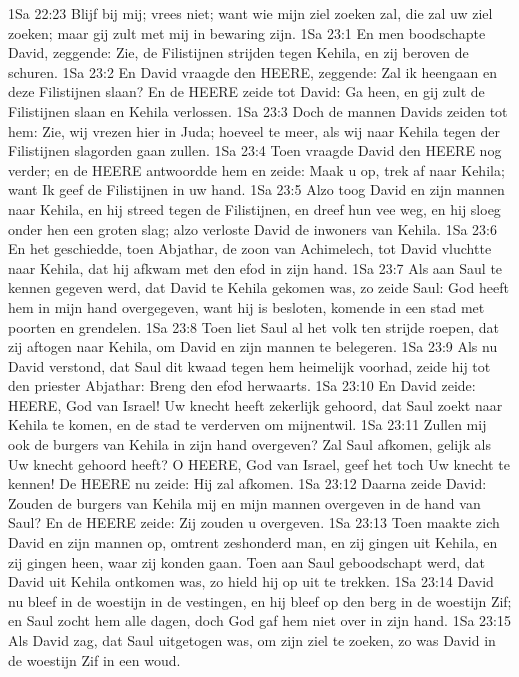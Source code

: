 1Sa 22:23  Blijf bij mij; vrees niet; want wie mijn ziel zoeken zal, die zal uw ziel zoeken; maar gij zult met mij in bewaring zijn.
1Sa 23:1  En men boodschapte David, zeggende: Zie, de Filistijnen strijden tegen Kehila, en zij beroven de schuren.
1Sa 23:2  En David vraagde den HEERE, zeggende: Zal ik heengaan en deze Filistijnen slaan? En de HEERE zeide tot David: Ga heen, en gij zult de Filistijnen slaan en Kehila verlossen.
1Sa 23:3  Doch de mannen Davids zeiden tot hem: Zie, wij vrezen hier in Juda; hoeveel te meer, als wij naar Kehila tegen der Filistijnen slagorden gaan zullen.
1Sa 23:4  Toen vraagde David den HEERE nog verder; en de HEERE antwoordde hem en zeide: Maak u op, trek af naar Kehila; want Ik geef de Filistijnen in uw hand.
1Sa 23:5  Alzo toog David en zijn mannen naar Kehila, en hij streed tegen de Filistijnen, en dreef hun vee weg, en hij sloeg onder hen een groten slag; alzo verloste David de inwoners van Kehila.
1Sa 23:6  En het geschiedde, toen Abjathar, de zoon van Achimelech, tot David vluchtte naar Kehila, dat hij afkwam met den efod in zijn hand.
1Sa 23:7  Als aan Saul te kennen gegeven werd, dat David te Kehila gekomen was, zo zeide Saul: God heeft hem in mijn hand overgegeven, want hij is besloten, komende in een stad met poorten en grendelen.
1Sa 23:8  Toen liet Saul al het volk ten strijde roepen, dat zij aftogen naar Kehila, om David en zijn mannen te belegeren.
1Sa 23:9  Als nu David verstond, dat Saul dit kwaad tegen hem heimelijk voorhad, zeide hij tot den priester Abjathar: Breng den efod herwaarts.
1Sa 23:10  En David zeide: HEERE, God van Israel! Uw knecht heeft zekerlijk gehoord, dat Saul zoekt naar Kehila te komen, en de stad te verderven om mijnentwil.
1Sa 23:11  Zullen mij ook de burgers van Kehila in zijn hand overgeven? Zal Saul afkomen, gelijk als Uw knecht gehoord heeft? O HEERE, God van Israel, geef het toch Uw knecht te kennen! De HEERE nu zeide: Hij zal afkomen.
1Sa 23:12  Daarna zeide David: Zouden de burgers van Kehila mij en mijn mannen overgeven in de hand van Saul? En de HEERE zeide: Zij zouden u overgeven.
1Sa 23:13  Toen maakte zich David en zijn mannen op, omtrent zeshonderd man, en zij gingen uit Kehila, en zij gingen heen, waar zij konden gaan. Toen aan Saul geboodschapt werd, dat David uit Kehila ontkomen was, zo hield hij op uit te trekken.
1Sa 23:14  David nu bleef in de woestijn in de vestingen, en hij bleef op den berg in de woestijn Zif; en Saul zocht hem alle dagen, doch God gaf hem niet over in zijn hand.
1Sa 23:15  Als David zag, dat Saul uitgetogen was, om zijn ziel te zoeken, zo was David in de woestijn Zif in een woud.
